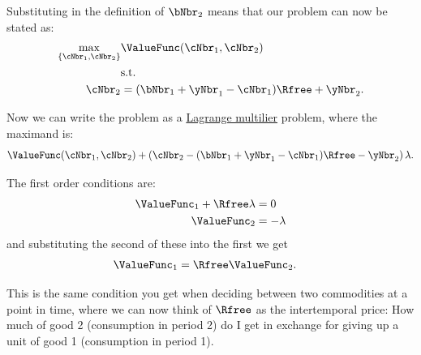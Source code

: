   Substituting in the definition of $\bNbr_{2}$ means that our problem
  can now be stated as:
  \begin{equation}\begin{gathered}\begin{aligned}
        \max_{\{\cNbr_{1},\cNbr_{2}\}} &   \ValueFunc(\cNbr_{1},\cNbr_{2})  \\
        & \mbox{s.t.}    \nonumber \\
        \cNbr_{2} & =  (\bNbr_{1}+\yNbr_{1}-\cNbr_{1})\Rfree+\yNbr_{2}.
      \end{aligned}\end{gathered}\end{equation}

  Now we can write the problem as a \href{https://en.wikipedia.org/wiki/Lagrange_multiplier}{Lagrange multilier} problem, where the maximand is:
  \begin{equation}
    \ValueFunc(\cNbr_{1},\cNbr_{2}) + \left(  \cNbr_{2}- (\bNbr_{1}+\yNbr_{1}-\cNbr_{1})\Rfree-\yNbr_{2}\right)\lambda.
  \end{equation}

  The first order conditions are:
  \begin{equation}\begin{gathered}\begin{aligned}
        \ValueFunc_{1} + \Rfree\lambda & =  0  \label{eq:lagrange1}\\
        \ValueFunc_{2} & =  -\lambda
      \end{aligned}\end{gathered}\end{equation}
  and substituting the second of these into the first we get
  \begin{equation}\begin{gathered}\begin{aligned}
        \ValueFunc_{1} & =  \Rfree \ValueFunc_{2} \label{eq:timeprice}.
      \end{aligned}\end{gathered}\end{equation}

  This is the same condition you get when deciding between two commodities at a point in time, where we can now think of $\Rfree$ as the intertemporal price: How much of good 2 (consumption in period 2) do I get in exchange for giving up a unit of good 1 (consumption in period 1).

